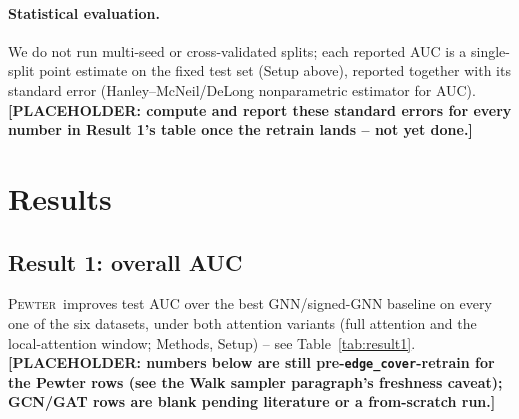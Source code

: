 \documentclass[letterpaper]{article} %
\newcommand{\method}{\textsc{Pewter}\xspace}
\newcommand{\ph}[1]{\textbf{[#1]}}  %
\theoremstyle{plain}
\theoremstyle{definition}
\begin{document}
\paragraph{Statistical evaluation.} We do not run multi-seed or cross-validated splits; each reported AUC is a single-split point estimate on the fixed test set (Setup above), reported together with its standard error (Hanley--McNeil/DeLong nonparametric estimator for AUC). \ph{PLACEHOLDER: compute and report these standard errors for every number in Result 1's table once the retrain lands -- not yet done.}

\section{Results}
\subsection{Result 1: overall AUC}
\method\ improves test AUC over the best GNN/signed-GNN baseline on every one of the six datasets, under both attention variants (full attention and the local-attention window; Methods, Setup) -- see Table~\ref{tab:result1}. \ph{PLACEHOLDER: numbers below are still pre-\texttt{edge\_cover}-retrain for the Pewter rows (see the Walk sampler paragraph's freshness caveat); GCN/GAT rows are blank pending literature or a from-scratch run.}
\end{document}
